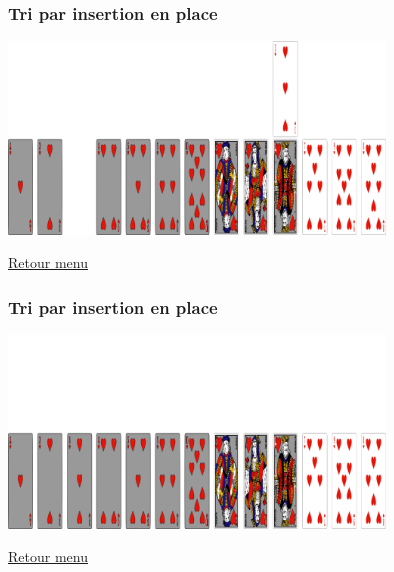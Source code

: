 \documentclass[svgnames,11pt]{beamer}
\begin{document}
\begin{frame}
    \frametitle{Tri par insertion en place}

    \begin{center}
        \centering
        \includegraphics[width=10cm]{ressources/insertion-7.png}
        \label{pique}
    \end{center}
    \hyperlink{menu}{Retour menu}

\end{frame}

\begin{frame}
    \frametitle{Tri par insertion en place}

    \begin{center}
        \centering
        \includegraphics[width=10cm]{ressources/insertion-8.png}
        \label{pique}
    \end{center}
    \hyperlink{menu}{Retour menu}

\end{frame}
\end{document}

